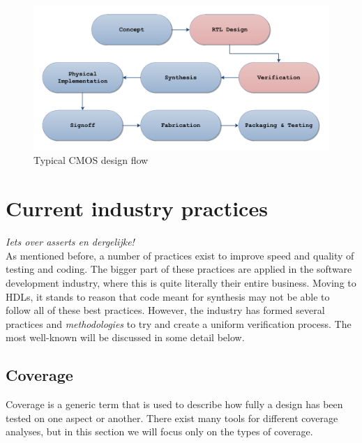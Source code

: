 \documentclass[11pt,british]{article}
\begin{document}
\begin{figure}[h]
    \centering
	\includegraphics[width=\textwidth]{images/VHDLflow.pdf}
    \caption{Typical CMOS design flow}
    \label{fig:Design_Flow}
\end{figure}

\newpage

\section{Current industry practices}
\label{sec:industry}
\emph{\color{red} Iets over asserts en dergelijke!}\\
As mentioned before, a number of practices exist to improve speed and quality of testing and coding. The bigger part of these practices are applied in the software development industry, where this is quite literally their entire business. Moving to \gls{HDL}s, it stands to reason that code meant for synthesis may not be able to follow all of these best practices. However, the industry has formed several practices and \emph{methodologies} to try and create a uniform verification process. The most well-known will be discussed in some detail below.

\subsection{Coverage}
Coverage is a generic term that is used to describe how fully a design has been tested on one aspect or another. There exist many tools for different coverage analyses, but in this section we will focus only on the types of coverage.
\end{document}
